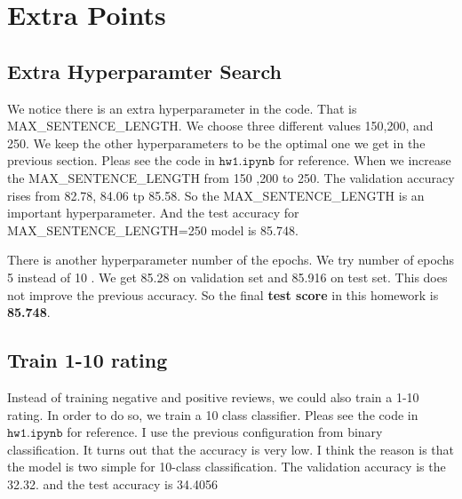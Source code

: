 \documentclass[10pt,a4paper]{article}
\begin{document}
\section{Extra Points}
\subsection{Extra Hyperparamter Search}
We notice there is an extra hyperparameter in the code. That is MAX\_SENTENCE\_LENGTH. We choose three different values 150,200, and 250. We keep the other hyperparameters to be the optimal one we get in the previous section. Pleas see the code in $\texttt{hw1.ipynb}$ for reference. When we increase the MAX\_SENTENCE\_LENGTH from 150 ,200 to 250. The validation accuracy rises from 82.78, 84.06 tp 85.58. So the MAX\_SENTENCE\_LENGTH is an important hyperparameter. And the test accuracy for MAX\_SENTENCE\_LENGTH=250 model is 85.748.

There is another hyperparameter number of the epochs.  We try number of epochs 5 instead of 10 . We get 85.28 on validation set and 85.916 on test set. This does not improve the previous accuracy. So the final \textbf{test score} in this homework is \textbf{85.748}. 
\subsection{Train 1-10 rating}
Instead of training negative and positive reviews, we could also train a 1-10 rating. In order to do so, we train a 10 class classifier. Pleas see the code in $\texttt{hw1.ipynb}$ for reference. I use the previous configuration from binary classification. It turns out that the accuracy is very low. I think the reason is that the model is two simple for 10-class classification. The validation accuracy is the 32.32. and the test accuracy is 34.4056
\end{document}
